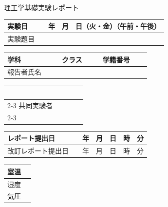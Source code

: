 \documentclass[dvipdfmx]{jlreq}		%
\begin{document}
\begin{center}
  {\huge{理工学基礎実験レポート}}
\end{center}
  
\baselineskip

\begin{table}[!h]
\renewcommand{\arraystretch}{1.8}
 \centering
 \large
  \begin{tabular}{|p{25mm}|p{122mm}|}
   \hline
   実験日 &　年　月　日（火・金）（午前・午後） \\
   \hline
   実験題目 &   \\
   \hline
  \end{tabular}

\baselineskip

  \begin{tabular}{|p{22.5mm}|p{38mm}|p{13mm}|p{13mm}|p{18mm}|p{28mm}|}
   \hline
   学科 &　& クラス &　& 学籍番号 &　\\
   \hline
   報告者氏名 & \multicolumn{5}{l|}{　} \\
   \hline
  \end{tabular}

\baselineskip

  \begin{tabular}{|p{22.5mm}|p{60.5mm}|p{60.5mm}|}
   \hline
   　&  &　\\
   \cline{2-3}
   共同実験者 &　&　\\
   \cline{2-3}
   　&  &　\\
   \hline
  \end{tabular}

\baselineskip

  \begin{tabular}{|p{39mm}|p{108mm}|}
   \hline
   レポート提出日 &　年　月　日　時　分 \\
   \hline
   改訂レポート提出日 &　年　月　日　時　分 \\
   \hline
  \end{tabular}

\baselineskip

\begin{flushleft}
  \begin{tabular}{|p{13.5mm}|p{60.5mm}|}
   \hline
   室温 &  \\
   \hline
   湿度 &  \\
   \hline
   気圧 &  \\
   \hline
  \end{tabular}
\end{flushleft}

\renewcommand{\arraystretch}{1.0}
\end{table}
\end{document}
